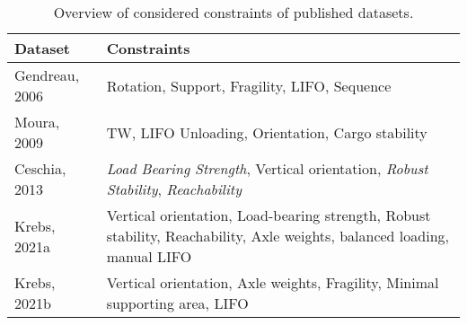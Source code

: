 \begin{table}[h]
    \centering
    \small
    \begin{tabular}{@{}lp{}@{}}
        \toprule
        \textbf{Dataset} & \textbf{Constraints}                                                                                                     \\
        \midrule
        Gendreau, 2006   & Rotation, Support, Fragility, LIFO, Sequence                                                                             \\
        Moura, 2009      & TW, LIFO Unloading, Orientation, Cargo stability                                                                         \\
        Ceschia, 2013    & \textit{Load Bearing Strength}, Vertical orientation, \textit{Robust Stability}, \textit{Reachability}                   \\
        Krebs, 2021a     & Vertical orientation, Load-bearing strength, Robust stability, Reachability, Axle weights, balanced loading, manual LIFO \\
        Krebs, 2021b     & Vertical orientation, Axle weights, Fragility, Minimal supporting area, LIFO                                             \\
        \bottomrule
    \end{tabular}
    \caption{Overview of considered constraints of published datasets.}
    \label{tab:constraints_cvrp_instances}
\end{table}